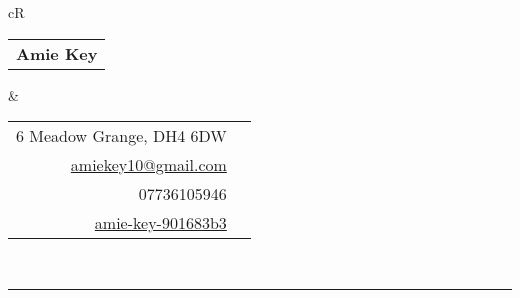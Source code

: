 \documentclass[hidelinks, 12pt, a4paper]{article}
\begin{document}
	\noindent
	\begin{tabularx}{\textwidth}{cR}
		\begin{tabular}{l}
			{\fontfamily{lmr}\selectfont
				\textbf{
				\HUGE Amie Key}
			}
		 \\
		\end{tabular} & 
	
		\begin{tabular}{rc}
			6 Meadow Grange, DH4 6DW & \faHome\\
			\href{mailto:amiekey10@gmail.com}{amiekey10@gmail.com} & \href{mailto:amiekey10@gmail.com}{\faEnvelope}\\
			07736105946 & \faPhone \\
			\href{https://www.linkedin.com/in/amie-key-901683b3/}{amie-key-901683b3} & \href{https://www.linkedin.com/in/amie-key-901683b3/}{\faLinkedin} \\
		\end{tabular} \\
	\end{tabularx}

	\par\noindent\rule{\textwidth}{0.2pt}
\end{document}
